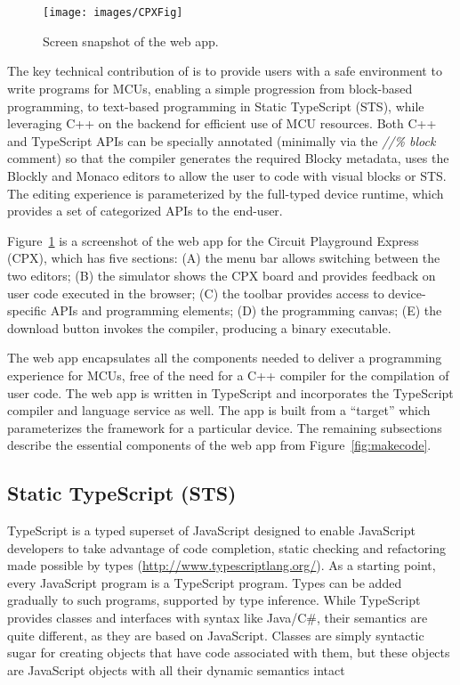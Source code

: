 \section{\MC}
\label{sec:makecode}

\begin{figure}[t]
    \texttt{[image: images/CPXFig]}
\caption{\label{fig:screenSnap}Screen snapshot of the \MC web app.}
\end{figure}
The key technical contribution of \MC is to provide users with a safe environment to write programs for MCUs, enabling a simple progression from block-based programming, to text-based programming in Static TypeScript (STS), while leveraging C++ on the backend for efficient use of MCU resources. Both C++ and TypeScript APIs can be specially annotated (minimally via the \emph{//\% block} comment) so that the \MC compiler generates the required Blocky metadata, \MC uses the Blockly and Monaco editors to allow the user to code with visual blocks or STS. The editing experience is parameterized by the full-typed device runtime, which provides a set of categorized APIs to the end-user.

Figure~\ref{fig:screenSnap} is a screenshot of the \MC web app for the Circuit Playground Express (CPX), which has five sections: (A) the menu bar allows switching between the two editors; (B) the simulator shows the CPX board and provides feedback on user code executed in the browser; (C) the toolbar provides access to device-specific APIs and programming elements; (D) the programming canvas; (E) the download button invokes the compiler, producing a binary executable.

The web app encapsulates all the components needed to deliver a programming experience for MCUs, free of the need for a C++ compiler for the compilation of user code. The web app is written in TypeScript and incorporates the TypeScript compiler and language service as well. The app is built from a \MC ``target'' which parameterizes the \MC framework for a particular device. The remaining subsections describe the essential components of the web app from Figure~\ref{fig:makecode}.

\subsection{Static TypeScript (STS)}

TypeScript is a typed superset of JavaScript designed to enable JavaScript developers to take advantage of code
completion, static checking and refactoring made possible by types (\url{http://www.typescriptlang.org/}).
As a starting point, every JavaScript program is a TypeScript program.  Types can be added gradually to such programs, supported by type inference. While TypeScript provides classes and interfaces with syntax like
Java/C\#, their semantics are quite different, as they are based on JavaScript. Classes are simply syntactic sugar for creating objects that have code associated with them, but these objects are
JavaScript objects with all their dynamic semantics intact

